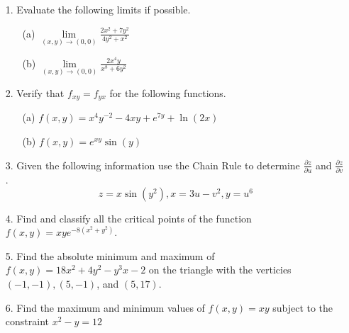 \documentclass[12pt, amssymb, one column]{article}
\begin{document}
\begin{itemize}
	\item[1.] Evaluate the following limits if possible.
		\begin{itemize}
			\item[(a)] $\lim\limits_{(x,y) \to (0,0)} \frac{2x^2 + 7y^2}{4y^2+x^2}$
			\item[(b)] $\lim\limits_{(x,y) \to (0,0)} \frac{2x^4y}{x^8+6y^2}$
		\end{itemize}
	
	\item[2.] Verify that $f_{xy} = f_{yx}$ for the following functions.
		\begin{itemize}
			\item[(a)]$f(x,y) = x^4y^{-2} -4xy+e^{7y} +\ln(2x)$
			\item[(b)]$f(x,y) = e^{xy}\sin(y)$
		\end{itemize}
	
	\item[3.] Given the following information use the Chain Rule to determine $\frac{\partial z}{\partial u}$ and $\frac{\partial z}{\partial v}$.
	$$z=x\sin(y^2), x=3u-v^2, y=u^6$$
	
	\item[4.] Find and classify all the critical points of the function $f(x,y) = xye^{-8(x^2+y^2)}$.
	
	\item[5.] Find the absolute minimum and maximum of $f(x,y) = 18x^2 + 4y^2 -y^3x-2$ on the triangle with the verticies $(-1,-1),(5,-1)$, and $(5,17)$.
			
	\item[6.] Find the maximum and minimum values of $f(x,y) = xy$ subject to the constraint $x^2-y=12$
\end{itemize}
\end{document}
